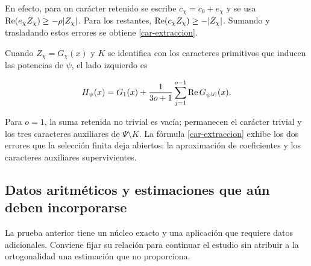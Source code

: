 En efecto, para un carácter retenido se escribe $c_\chi=c_0+e_\chi$ y se usa $\operatorname{Re}(e_\chi Z_\chi)\ge-\rho|Z_\chi|$. Para los restantes, $\operatorname{Re}(c_\chi Z_\chi)\ge-|Z_\chi|$. Sumando y trasladando estos errores se obtiene \eqref{car-extraccion}.

Cuando $Z_\chi=G_\chi(x)$ y $K$ se identifica con los caracteres primitivos que inducen las potencias de $\psi$, el lado izquierdo es

\[
H_\psi(x)=G_1(x)+\frac1{3o+1}
\sum_{j=1}^{o-1}\operatorname{Re} G_{\psi^{[j]}}(x).
\]

Para $o=1$, la suma retenida no trivial es vacía; permanecen el carácter trivial y los tres caracteres auxiliares de $\Psi\setminus K$. La fórmula \eqref{car-extraccion} exhibe los dos errores que la selección finita deja abiertos: la aproximación de coeficientes y los caracteres auxiliares supervivientes.

\subsection{Datos aritméticos y estimaciones que aún deben incorporarse}
\label{car-entradas}

La prueba anterior tiene un núcleo exacto y una aplicación que requiere datos adicionales. Conviene fijar su relación para continuar el estudio sin atribuir a la ortogonalidad una estimación que no proporciona.

